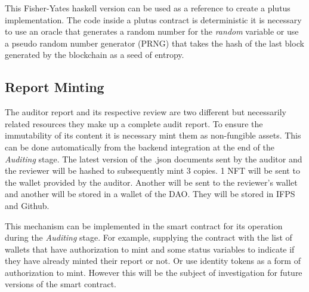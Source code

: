 \documentclass[9pt]{article}
\begin{document}
This Fisher-Yates haskell version can be used as a reference to create a plutus implementation. The code inside a plutus contract is deterministic it is necessary to use an oracle that generates a random number for the \emph {random} variable or use a pseudo random number generator (PRNG) that takes the hash of the last block generated by the blockchain as a seed of entropy.

\subsection { Report Minting }

The auditor report and its respective review are two different but necessarily related resources they make up a complete audit report. To ensure the immutability of its content it is necessary mint them as non-fungible assets. This can be done automatically from the backend integration at the end of the \emph{Auditing} stage. 
The latest version of the .json documents sent by the auditor and the reviewer will be hashed to subsequently mint 3 copies. 1 NFT will be sent to the wallet provided by the auditor. Another will be sent to the reviewer's wallet and another will be stored in a wallet of the DAO. They will be stored in IFPS and Github.

This mechanism can be implemented in the smart contract for its operation during the \emph{Auditing} stage. For example, supplying the contract with the list of wallets that have authorization to mint and some status variables to indicate if they have already minted their report or not. Or use identity tokens as a form of authorization to mint. However this will be the subject of investigation for future versions of the smart contract.
\end{document}
